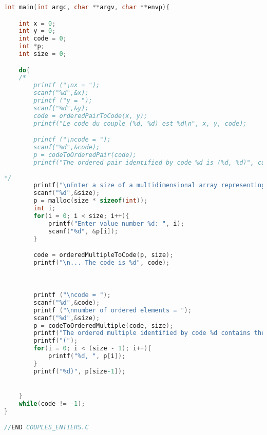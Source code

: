 \documentclass{article}
\begin{document}
\begin{lstlisting}[language=C]
int main(int argc, char **argv, char **envp){

	int x = 0;
	int y = 0;
	int code = 0;
	int *p;
	int size = 0;

	do{
	/*
		printf ("\nx = ");
		scanf("%d",&x);
		printf ("y = ");
		scanf("%d",&y);
		code = orderedPairToCode(x, y);
		printf("Le code du couple (%d, %d) est %d\n", x, y, code);

		printf ("\ncode = ");
		scanf("%d",&code);
		p = codeToOrderedPair(code);
		printf("The ordered pair identified by code %d is (%d, %d)", code, p[0], p[1]);
	
*/			
		printf("\nEnter a size of a multidimensional array representing a 'ordered multiple': ");
		scanf("%d",&size);
		p = malloc(size * sizeof(int));
		int i;
		for(i = 0; i < size; i++){
			printf("Enter value number %d: ", i);
			scanf("%d", &p[i]);
		}

		code = orderedMultipleToCode(p, size);
		printf("\n... The code is %d", code);
	


		printf ("\ncode = ");
		scanf("%d",&code);
		printf ("\nnumber of ordered elements = ");
		scanf("%d",&size);
		p = codeToOrderedMultiple(code, size);
		printf("The ordered multiple identified by code %d contains the following elements: ", code);
		printf("(");
		for(i = 0; i < (size - 1); i++){
			printf("%d, ", p[i]);
		}
		printf("%d)", p[size-1]);


	}
	while(code != -1);
}

//END COUPLES_ENTIERS.C
\end{lstlisting}
\end{document}
